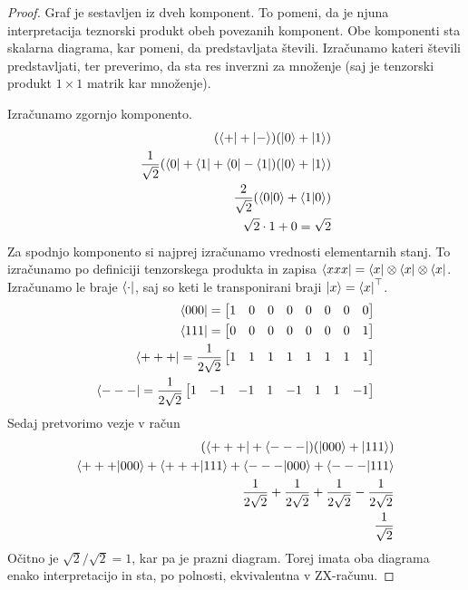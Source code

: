 \documentclass[mat1]{fmfdelo}
\newcommand{\tranp}{\top}
\begin{document}
\begin{proof}
    Graf je sestavljen iz dveh komponent. To pomeni, da je njuna interpretacija teznorski produkt obeh povezanih komponent. Obe komponenti sta skalarna diagrama, kar pomeni, da predstavljata števili. Izračunamo kateri števili predstavljati, ter preverimo, da sta res inverzni za množenje (saj je tenzorski produkt \(1\times 1\) matrik kar množenje).

    Izračunamo zgornjo komponento.
    \begin{align*}
        (\bra{+}+\ket{-})(\ket0 + \ket 1)\\
        \frac{1}{\sqrt2}(\bra{0}+\bra{1}+\bra0-\bra1)(\ket0 + \ket 1)\\
        \frac{2}{\sqrt2}(\braket{0}{0}+\braket{1}{0})\\
        \sqrt{2}\cdot 1 + 0 = \sqrt2
    \end{align*}
    Za spodnjo komponento si najprej izračunamo vrednosti elementarnih stanj. To izračunamo po definiciji tenzorskega produkta in zapisa \(\bra{xxx} = \bra{x}\otimes \bra{x}\otimes \bra{x}\). Izračunamo le braje \(\bra{\cdot}\), saj so keti le transponirani braji \(\ket{x}=\bra{x}^\tranp\).
    \begin{align*}
        \bra{000} = \begin{bmatrix}
            1&0&0&0& 0&0&0&0
        \end{bmatrix}\\
        \bra{111} = \begin{bmatrix}
            0&0&0&0& 0&0&0&1
        \end{bmatrix}\\
        \bra{+++} = \frac{1}{2\sqrt{2}}\begin{bmatrix}
            1&1&1&1& 1&1&1&1
        \end{bmatrix}\\
        \bra{---} = \frac{1}{2\sqrt{2}} \begin{bmatrix}
            1&-1&-1&1& -1&1&1&-1
        \end{bmatrix}
    \end{align*}
    Sedaj pretvorimo vezje v račun
    \begin{align*}
        (\bra{+++}+\bra{---})(\ket{000}+\ket{111})\\
        \braket{+++}{000}+\braket{+++}{111}+\braket{---}{000}+\braket{---}{111}\\
        \frac{1}{2\sqrt2}+\frac{1}{2\sqrt2}+\frac{1}{2\sqrt2}-\frac{1}{2\sqrt2}\\
        \frac{1}{\sqrt2}
    \end{align*}
    Očitno je \(\sqrt2/\sqrt2 = 1\), kar pa je prazni diagram. Torej imata oba diagrama enako interpretacijo in sta, po polnosti, ekvivalentna v ZX-računu.
\end{proof}
\end{document}
